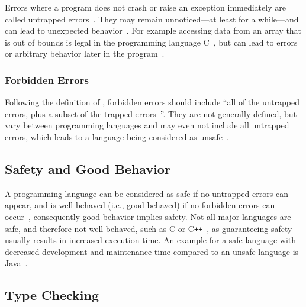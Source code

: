 Errors where a program does not crash or raise an exception immediately are called untrapped errors~\cite[p.~97-37]{TypeSystems:Cardelli:2004}. They may remain unnoticed---at least for a while---and can lead to unexpected behavior~\cite[p.~97-3]{TypeSystems:Cardelli:2004}. For example accessing data from an array that is out of bounds is legal in the programming language C~\cite[p.~7]{TypesAndProgrammingLanguages:Pierce:2002}, but can lead to errors or arbitrary behavior later in the program~\cite[p.~97-3]{TypeSystems:Cardelli:2004}.

\subsubsection{Forbidden Errors}

Following the definition of \citeauthor{TypeSystems:Cardelli:2004}, forbidden errors should include ``all of the untrapped errors, plus a subset of the trapped errors~\cite[p.~97-3]{TypeSystems:Cardelli:2004}''. They are not generally defined, but vary between programming languages and may even not include all untrapped errors, which leads to a language being  considered as unsafe~\cite[p.~97-4]{TypeSystems:Cardelli:2004}.

\subsection{Safety and Good Behavior}
\label{sec:safety-good-behavior}

A programming language can be considered as safe if no untrapped errors can appear, and is well behaved (i.e., good behaved) if no forbidden errors can occur~\cite[p.~97-3]{TypeSystems:Cardelli:2004}, consequently good behavior implies safety. Not all major languages are safe, and therefore not well behaved, such as C or C\texttt{++}~\cite[p.~6]{TypesAndProgrammingLanguages:Pierce:2002}, as guaranteeing safety usually results in increased execution time. An example for a safe language with decreased development and maintenance time compared to an unsafe language is Java~\cite[p.~97-5]{TypeSystems:Cardelli:2004}.

\subsection{Type Checking}
\label{sec:type-checking}

